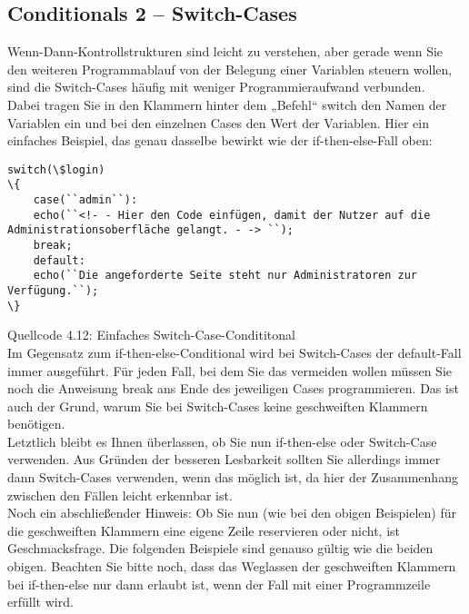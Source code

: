 \subsection{Conditionals 2 – Switch-Cases}

Wenn-Dann-Kontrollstrukturen sind leicht zu verstehen, aber gerade wenn Sie den weiteren Programmablauf von der Belegung einer Variablen steuern wollen, sind die Switch-Cases häufig mit weniger Programmieraufwand verbunden.\\

Dabei tragen Sie in den Klammern hinter dem „Befehl“ switch den Namen der Variablen ein und bei den einzelnen Cases den Wert der Variablen. Hier ein einfaches Beispiel, das genau dasselbe bewirkt wie der if-then-else-Fall oben:\\

\begin{verbatim}
switch(\$login)
\{
	case(``admin``):
	echo(``<!- - Hier den Code einfügen, damit der Nutzer auf die Administrationsoberfläche gelangt. - -> ``);
	break;
	default:
	echo(``Die angeforderte Seite steht nur Administratoren zur Verfügung.``);
\}
\end{verbatim}
Quellcode 4.12: Einfaches Switch-Case-Condititonal\\

Im Gegensatz zum if-then-else-Conditional wird bei Switch-Cases der default-Fall immer ausgeführt. Für jeden Fall, bei dem Sie das vermeiden wollen müssen Sie noch die Anweisung break ans Ende des jeweiligen Cases programmieren. Das ist auch der Grund, warum Sie bei Switch-Cases keine geschweiften Klammern benötigen.\\

Letztlich bleibt es Ihnen überlassen, ob Sie nun if-then-else oder Switch-Case verwenden. Aus Gründen der besseren Lesbarkeit sollten Sie allerdings immer dann Switch-Cases verwenden, wenn das möglich ist, da hier der Zusammenhang zwischen den Fällen leicht erkennbar ist.\\

Noch ein abschließender Hinweis: Ob Sie nun (wie bei den obigen Beispielen) für die geschweiften Klammern eine eigene Zeile reservieren oder nicht, ist Geschmacksfrage. Die folgenden Beispiele sind genauso gültig wie die beiden obigen. Beachten Sie bitte noch, dass das Weglassen der geschweiften Klammern bei if-then-else nur dann erlaubt ist, wenn der Fall mit einer Programmzeile erfüllt wird.\\

